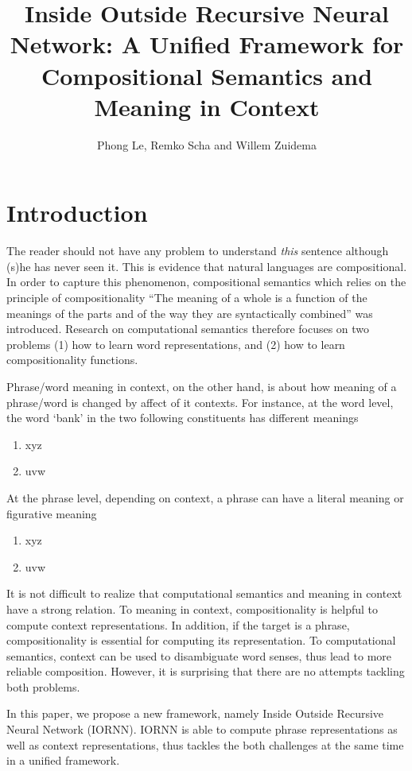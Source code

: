 \documentclass[11pt]{article}
\title{Inside Outside Recursive Neural Network: A Unified Framework for 
Compositional Semantics and Meaning in Context}
\author{Phong Le, Remko Scha \textnormal{and} Willem Zuidema}
\begin{document}
\maketitle

\section{Introduction}
\label{section introduction}

The reader should not have any problem to understand \textit{this} sentence although 
(s)he has never seen it. This is evidence that natural languages are compositional.
In order to capture this phenomenon, compositional semantics which relies on the principle 
of compositionality ``The meaning of a whole is a function of the meanings of the parts 
and of the way they are syntactically combined'' \cite{partee_lexical_1995}
was introduced. Research on computational semantics therefore focuses on two problems
(1) how to learn word representations, and (2) how to learn compositionality functions.

Phrase/word meaning in context, on the other hand, is about how meaning of a phrase/word
is changed by affect of it contexts. For instance, at the word level, the word `bank' in 
the two following constituents has different meanings
\begin{enumerate}
	\item xyz
	\item uvw
\end{enumerate}
At the phrase level, depending on context, a phrase can have a literal meaning or figurative
meaning
\begin{enumerate}
	\item xyz
	\item uvw
\end{enumerate}

It is not difficult to realize that computational semantics and meaning in context 
have a strong relation. To meaning in context, compositionality is helpful to compute 
context representations. In addition, if the target is a phrase, compositionality is 
essential for computing its representation. To computational semantics, context can be 
used to disambiguate word senses, thus lead to more reliable composition.
However, it is surprising that there are no attempts tackling both problems. 

In this paper, we propose a new framework, namely Inside Outside Recursive 
Neural Network (IORNN). IORNN is able to compute phrase representations 
as well as context representations, thus tackles the both challenges at the same time
in a unified framework.
\end{document}
